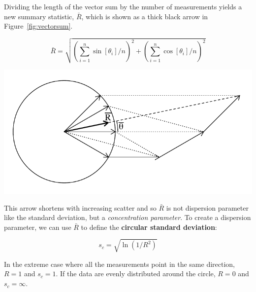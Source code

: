 Dividing the length of the vector sum by the number of measurements
yields a new summary statistic, $\bar{R}$, which is shown as a thick
black arrow in Figure~\ref{fig:vectorsum}.

\begin{equation}
  \bar{R} = \sqrt{\left(\sum_{i=1}^{n} \sin[\theta_i]/n\right)^2 +
    \left( \sum_{i=1}^{n}\cos[\theta_i]/n \right)^2}
  \label{eq:circularR}
\end{equation}

\noindent\begin{minipage}[t][][b]{.45\textwidth}
\includegraphics[width=\textwidth]{../figures/vectorsum.pdf}\\
\end{minipage}
\begin{minipage}[t][][t]{.55\textwidth}
  \label{fig:vectorsum}
\end{minipage}

This arrow shortens with increasing scatter and so $\bar{R}$ is not
dispersion parameter like the standard deviation, but a
\textit{concentration parameter}. To create a dispersion parameter, we
can use $\bar{R}$ to define the \textbf{circular standard deviation}:

\begin{equation}
  s_c = \sqrt{\ln(1/R^2)}
  \label{eq:circularSD}
\end{equation}

In the extreme case where all the measurements point in the same
direction, $R = 1$ and $s_c = 1$. If the data are evenly distributed
around the circle, $R = 0$ and $s_c = \infty$.

